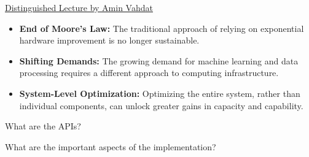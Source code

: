 \begin{slide}


    \href{https://youtu.be/9lBbqH_1KS4?feature=shared}
           {Distinguished Lecture by Amin Vahdat}
    \bigskip

    \begin{itemize}
        \item \textbf{End of Moore's Law:} The traditional approach of relying on exponential hardware improvement is no longer sustainable.
        \item \textbf{Shifting Demands:} The growing demand for machine learning and data processing requires a different approach to computing infrastructure.
        \item \textbf{System-Level Optimization:} Optimizing the entire system, rather than individual components, can unlock greater gains in capacity and capability.
    \end{itemize}

\end{slide}

\begin{slide}


    What are the APIs?
    \bigskip

    What are the important aspects of the implementation?

\end{slide}

%




